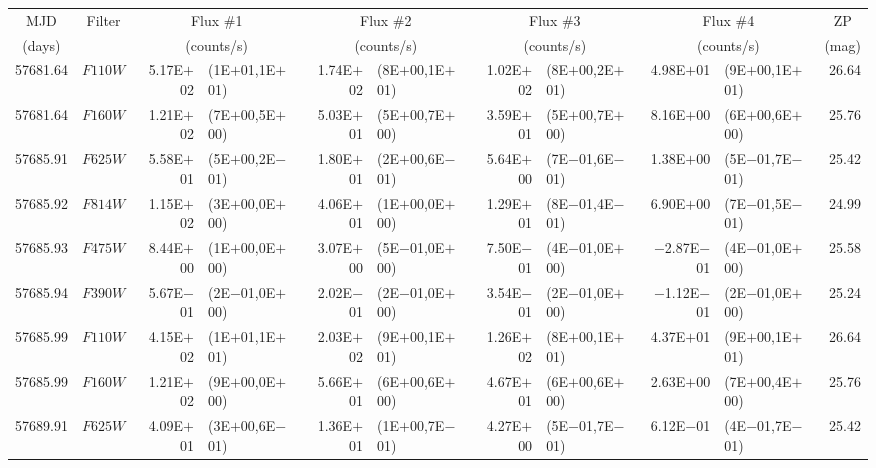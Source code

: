 \begin{tabular}{r c r @{\hspace{0.5em}} l r @{\hspace{0.5em}} l r @{\hspace{0.5em}} l r @{\hspace{0.5em}} l r}
\hline\hline
\multicolumn{1}{c}{MJD} & \multicolumn{1}{c}{Filter} & \multicolumn{2}{c}{Flux \#1} & \multicolumn{2}{c}{Flux \#2} & \multicolumn{2}{c}{Flux \#3} & \multicolumn{2}{c}{Flux \#4} & \multicolumn{1}{c}{ZP}\\
\multicolumn{1}{c}{(days)} & & \multicolumn{2}{c}{(counts/s)} & \multicolumn{2}{c}{(counts/s)} & \multicolumn{2}{c}{(counts/s)} & \multicolumn{2}{c}{(counts/s)} & \multicolumn{1}{c}{(mag)}\\
\hline
57681.64 & $F110W$ & 5.17E$+$02 & (1E$+$01,1E$+$01) & 1.74E$+$02 & (8E$+$00,1E$+$01) & 1.02E$+$02 & (8E$+$00,2E$+$01) & 4.98E$+$01 & (9E$+$00,1E$+$01) & 26.64\\
57681.64 & $F160W$ & 1.21E$+$02 & (7E$+$00,5E$+$00) & 5.03E$+$01 & (5E$+$00,7E$+$00) & 3.59E$+$01 & (5E$+$00,7E$+$00) & 8.16E$+$00 & (6E$+$00,6E$+$00) & 25.76\\
57685.91 & $F625W$ & 5.58E$+$01 & (5E$+$00,2E$-$01) & 1.80E$+$01 & (2E$+$00,6E$-$01) & 5.64E$+$00 & (7E$-$01,6E$-$01) & 1.38E$+$00 & (5E$-$01,7E$-$01) & 25.42\\
57685.92 & $F814W$ & 1.15E$+$02 & (3E$+$00,0E$+$00) & 4.06E$+$01 & (1E$+$00,0E$+$00) & 1.29E$+$01 & (8E$-$01,4E$-$01) & 6.90E$+$00 & (7E$-$01,5E$-$01) & 24.99\\
57685.93 & $F475W$ & 8.44E$+$00 & (1E$+$00,0E$+$00) & 3.07E$+$00 & (5E$-$01,0E$+$00) & 7.50E$-$01 & (4E$-$01,0E$+$00) & $-$2.87E$-$01 & (4E$-$01,0E$+$00) & 25.58\\
57685.94 & $F390W$ & 5.67E$-$01 & (2E$-$01,0E$+$00) & 2.02E$-$01 & (2E$-$01,0E$+$00) & 3.54E$-$01 & (2E$-$01,0E$+$00) & $-$1.12E$-$01 & (2E$-$01,0E$+$00) & 25.24\\
57685.99 & $F110W$ & 4.15E$+$02 & (1E$+$01,1E$+$01) & 2.03E$+$02 & (9E$+$00,1E$+$01) & 1.26E$+$02 & (8E$+$00,1E$+$01) & 4.37E$+$01 & (9E$+$00,1E$+$01) & 26.64\\
57685.99 & $F160W$ & 1.21E$+$02 & (9E$+$00,0E$+$00) & 5.66E$+$01 & (6E$+$00,6E$+$00) & 4.67E$+$01 & (6E$+$00,6E$+$00) & 2.63E$+$00 & (7E$+$00,4E$+$00) & 25.76\\
57689.91 & $F625W$ & 4.09E$+$01 & (3E$+$00,6E$-$01) & 1.36E$+$01 & (1E$+$00,7E$-$01) & 4.27E$+$00 & (5E$-$01,7E$-$01) & 6.12E$-$01 & (4E$-$01,7E$-$01) & 25.42\\

\end{tabular}

